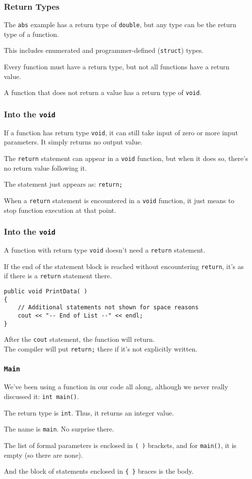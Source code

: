 \begin{frame}
\frametitle{Return Types}
The \texttt{abs} example has a return type of \texttt{double}, but any type can be the return type of a function.

This includes enumerated and programmer-defined (\texttt{struct}) types.

Every function must have a return type, but not all functions have a return value.

A function that does not return a value has a return type of \texttt{void}.

\end{frame}

\begin{frame}
\frametitle{Into the \texttt{void}}
If a function has return type \texttt{void}, it can still take input of zero or more input parameters. It simply returns no output value.

The \texttt{return} statement can appear in a \texttt{void} function, but when it does so, there's no return value following it.

The statement just appears as: \texttt{return;}

When a \texttt{return} statement is encountered in a \texttt{void} function, it just means to stop function execution at that point.

\end{frame}

\begin{frame}[fragile]
\frametitle{Into the \texttt{void}}

A function with return type \texttt{void} doesn't need a \texttt{return} statement.

If the end of the statement block is reached without encountering \texttt{return}, it's as if there is a \texttt{return} statement there.

\begin{verbatim}
public void PrintData( )
{
    // Additional statements not shown for space reasons
    cout << "-- End of List --" << endl;
}
\end{verbatim}

After the \texttt{cout} statement, the function will return.\\
\quad The compiler will put \texttt{return;} there if it's not explicitly written.

\end{frame}


\begin{frame}
\frametitle{\texttt{Main}}

We've been using a function in our code all along, although we never really discussed it: \texttt{int main()}.

The return type is \texttt{int}. Thus, it returns an integer value.

The name is \texttt{main}. No surprise there.

The list of formal parameters is enclosed in \texttt{( )} brackets, and for \texttt{main()}, it is empty (so there are none).

And the block of statements enclosed in \texttt{\{ \}} braces is the body.

\end{frame}

